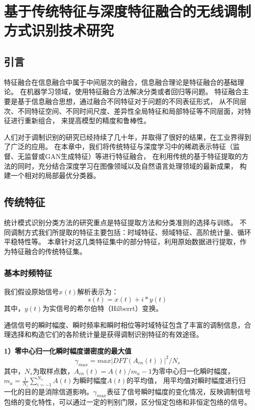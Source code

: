 \chapter{基于传统特征与深度特征融合的无线调制方式识别技术研究}
\section{引言}
特征融合在信息融合中属于中间层次的融合，信息融合理论是特征融合的基础理论。
在机器学习领域，使用特征融合方法解决分类或者回归等问题。
特征融合主要是基于信息融合思想，通过融合不同特征对于问题的不同表征形式，
从不同层次、不同特征空间、不同时间尺度、差异性全局特征和局部特征等不同层面，对特征进行重新组合，
来提高模型的精度和鲁棒性。\par

人们对于调制识别的研究已经持续了几十年，并取得了很好的结果，在工业界得到了广泛的应用。
在本章中，我们将传统特征与深度学习中的稀疏表示特征（监督、无监督或GAN生成特征）等进行特征融合，
在利用传统的基于特征提取的方法的同时，充分结合深度学习在图像领域以及自然语言处理领域的最新成果，
构建一个相对的局部最优分类器。\par

\section{传统特征}

统计模式识别分类方法的研究重点是特征提取方法和分类准则的选择与训练。
不同调制方式我们所提取的特征主要包括：时域特征、频域特征、高阶统计量、循环平稳特性等。
本章针对这几类特征集中的部分特征，利用原始数据进行提取，作为特征融合的传统特征集。\par

\subsection{基本时频特征}

我们假设原始信号$x(t)$解析表示为：
\begin{equation}
s(t)=x(t)+i*y(t)
\end{equation}
其中，$y(t)$为实信号的希尔伯特（Hilberrt）变换。\par

通信信号的瞬时幅度、瞬时频率和瞬时相位等时域特征包含了丰富的调制信息，合理选择和构造它们的各阶统计量是获得调制识别特征的有效途径。\par

\textbf{1）零中心归一化瞬时幅度谱密度的最大值}
\begin{equation}
\gamma_{max}=max|DFT(A_{cn}(t))|^{2}/N_s
\end{equation}
其中，$N_s$为取样点数，$A_{cn}(t)=A(t)/m_a-1$为零中心归一化瞬时幅度，
$m_a=\frac{1}{N_s}\sum_{i=-1}^{N_s}A(t)$为瞬时幅度$A(t)$的平均值，
用平均值对瞬时幅度进行归一化的目的是消除信道影响。$\gamma_{max}$表征了信号瞬时幅度的变化情况，反映调制信号包络的变化特性，可以通过一定的判别门限，区分恒定包络和非恒定包络的信号。


